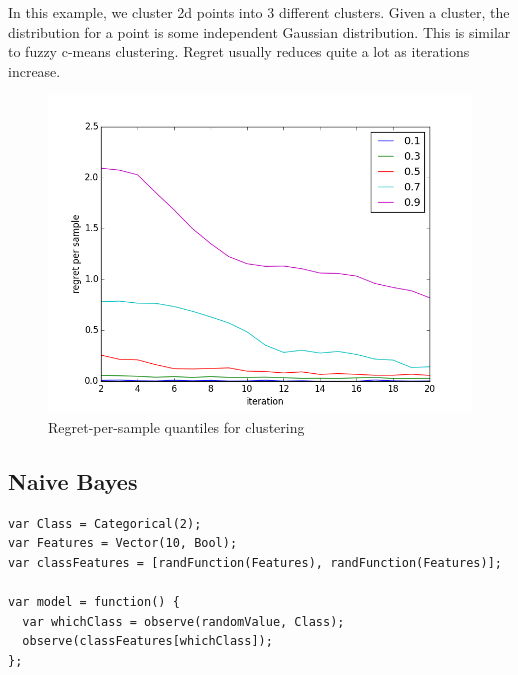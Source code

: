 \documentclass{article}
\begin{document}
In this example, we cluster 2d points into 3 different clusters.  Given a cluster, the distribution for a point is some independent Gaussian distribution.  This is similar to fuzzy c-means clustering.  Regret usually reduces quite a lot as iterations increase.

  \begin{figure}[h]
\begin{center}
  \includegraphics[scale=0.5]{../plots/accuracy_nd_clustering.png}
\end{center}
\caption{Regret-per-sample quantiles for clustering}
\end{figure}

% 

\FloatBarrier
\subsection{Naive Bayes}

{\small
\begin{lstlisting}
var Class = Categorical(2);
var Features = Vector(10, Bool);
var classFeatures = [randFunction(Features), randFunction(Features)];

var model = function() {
  var whichClass = observe(randomValue, Class);
  observe(classFeatures[whichClass]);
};
\end{lstlisting}
}
\end{document}
